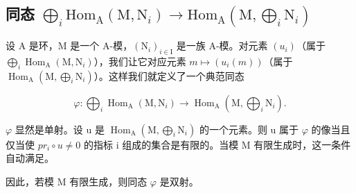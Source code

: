 \subsection{\texorpdfstring{同态 \(\bigoplus_{i} \mathrm{Hom}_{\mathrm{A}}(\mathrm{M}, \mathrm{N}_{i}) \longrightarrow \mathrm{Hom}_{\mathrm{A}}(\mathrm{M}, \bigoplus_{i} \mathrm{N}_{i})\)}{同态 \textbackslash bigoplus\_\{i\} \textbackslash mathrm\{Hom\}\_\{\textbackslash mathrm\{A\}\}(\textbackslash mathrm\{M\}, \textbackslash mathrm\{N\}\_\{i\}) \textbackslash longrightarrow \textbackslash mathrm\{Hom\}\_\{\textbackslash mathrm\{A\}\}(\textbackslash mathrm\{M\}, \textbackslash bigoplus\_\{i\} \textbackslash mathrm\{N\}\_\{i\})}}

设 A 是环，M 是一个 A-模，\((\mathrm{N}_{i})_{i\in\mathrm{I}}\) 是一族 A-模。对元素 \((u_{i})\)（属于 \(\bigoplus_{i}\operatorname{Hom}_{\mathrm{A}}(\mathrm{M},\mathrm{N}_{i})\)），我们让它对应元素 \(m\mapsto(u_{i}(m))\)（属于 \(\operatorname{Hom}_{\mathrm{A}}(\mathrm{M},\bigoplus_{i}\mathrm{N}_{i})\)）。这样我们就定义了一个典范同态

\[
\varphi : \bigoplus_ {i} \operatorname{Hom} _ {\mathrm{A}} (\mathrm{M}, \mathrm{N} _ {i}) \longrightarrow \operatorname{Hom} _ {\mathrm{A}} \left(\mathrm{M}, \bigoplus_ {i} \mathrm{N} _ {i}\right).
\]

\(\varphi\) 显然是单射。设 u 是 \(\operatorname{Hom}_{\mathrm{A}}(\mathrm{M},\bigoplus_{i}\mathrm{N}_{i})\) 的一个元素。则 u 属于 \(\varphi\) 的像当且仅当使 \(pr_{i}\circ u\neq0\) 的指标 i 组成的集合是有限的。当模 M 有限生成时，这一条件自动满足。

因此，若模 M 有限生成，则同态 \(\varphi\) 是双射。

